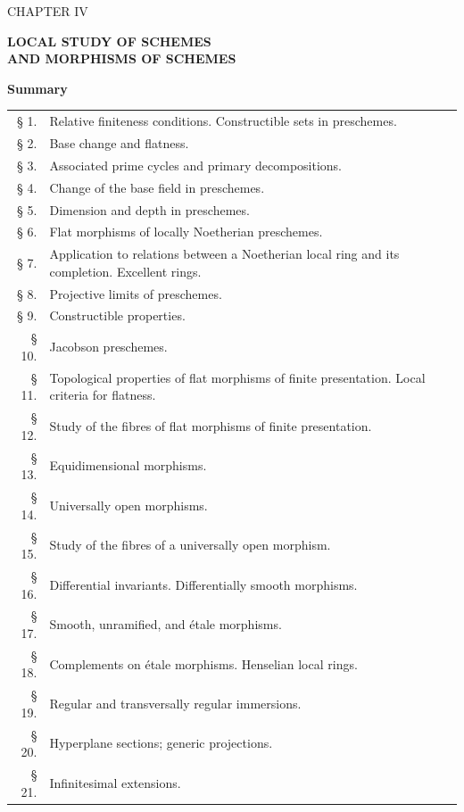 \cleardoublepage
{}
\thispagestyle{plain}

\begin{center}
{\Large CHAPTER IV}

\vspace{1.5cm}
{\LARGE\bfseries LOCAL STUDY OF SCHEMES\\[0.3em]
AND MORPHISMS OF SCHEMES}

\vspace{1.5cm}
{\large\bfseries Summary}
\end{center}

\medskip
\begin{tabular}{@{}r p{}}
§ 1. & Relative finiteness conditions. Constructible sets in preschemes.\\
§ 2. & Base change and flatness.\\
§ 3. & Associated prime cycles and primary decompositions.\\
§ 4. & Change of the base field in preschemes.\\
§ 5. & Dimension and depth in preschemes.\\
§ 6. & Flat morphisms of locally Noetherian preschemes.\\
§ 7. & Application to relations between a Noetherian local ring and its completion.
Excellent rings.\\
§ 8. & Projective limits of preschemes.\\
§ 9. & Constructible properties.\\
§ 10. & Jacobson preschemes.\\
§ 11.\footnotemark[1] & Topological properties of flat morphisms of finite presentation.
Local criteria for flatness.\\
§ 12. & Study of the fibres of flat morphisms of finite presentation.\\
§ 13. & Equidimensional morphisms.\\
§ 14. & Universally open morphisms.\\
§ 15. & Study of the fibres of a universally open morphism.\\
§ 16. & Differential invariants. Differentially smooth morphisms.\\
§ 17. & Smooth, unramified, and étale morphisms.\\
§ 18. & Complements on étale morphisms. Henselian local rings.\\
§ 19. & Regular and transversally regular immersions.\\
§ 20. & Hyperplane sections; generic projections.\\
§ 21. & Infinitesimal extensions.\\
\end{tabular}

